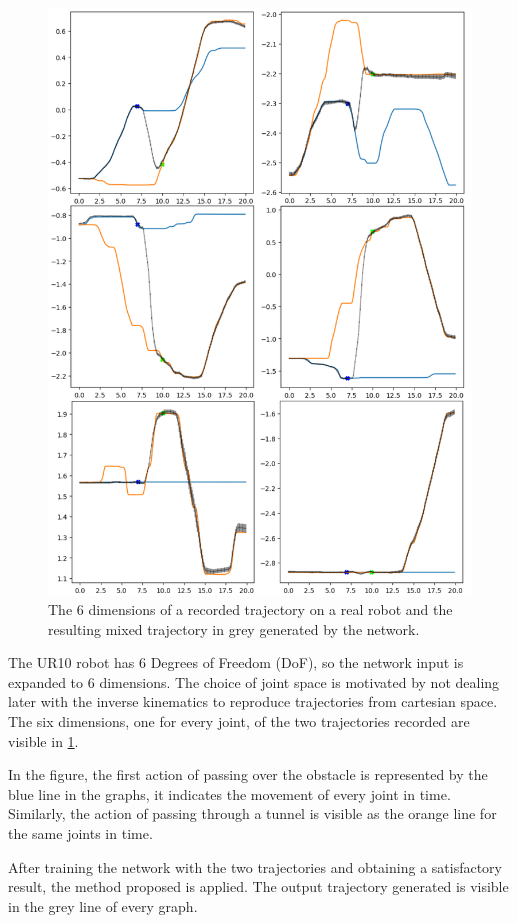 \begin{figure}
    \centering
    \includegraphics[width=0.9\linewidth]{Images/6Dv.png}
    \caption{ The 6 dimensions of a recorded trajectory on a real robot and the resulting mixed trajectory in grey generated by the network. }
    \label{fig:6Dtrain}
\end{figure}

The UR10 robot has 6 Degrees of Freedom (DoF), so the network input is expanded to 6 dimensions. The choice of joint space is motivated by not dealing later with the inverse kinematics to reproduce trajectories from cartesian space. The six dimensions, one for every joint, of the two trajectories recorded are visible in \cref{fig:6Dtrain}. 

In the figure, the first action of passing over the obstacle is represented by the blue line in the graphs, it indicates the movement of every joint in time. Similarly, the action of passing through a tunnel is visible as the orange line for the same joints in time. 

After training the network with the two trajectories and obtaining a satisfactory result, the method proposed is applied. 
The output trajectory generated is visible in the grey line of every graph. 

